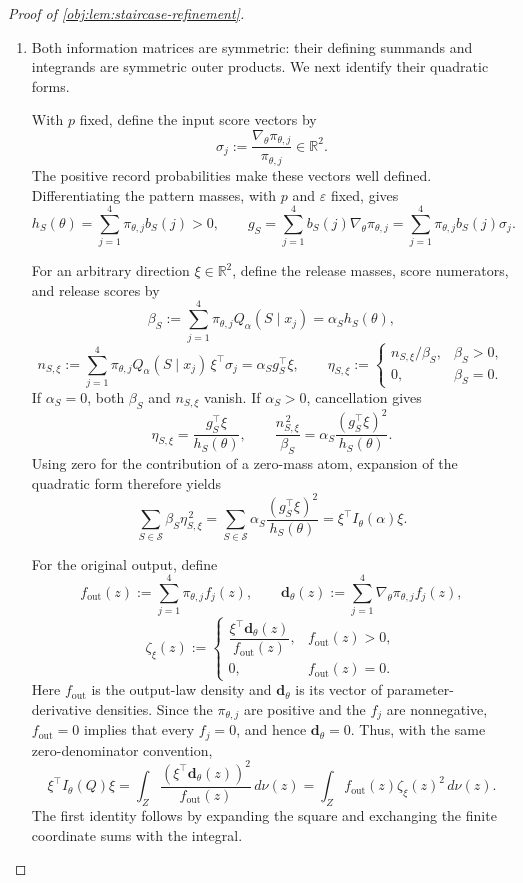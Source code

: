 \documentclass[11pt]{article}
\begin{document}
\begin{proof}[Proof of \cref{obj:lem:staircase-refinement}]
\begin{enumerate}
\item
Both information matrices are symmetric: their defining summands and integrands are symmetric outer products. We next identify their quadratic forms.

With \(p\) fixed, define the input score vectors by
\[
\sigma_j:=\frac{\nabla_\theta\pi_{\theta,j}}{\pi_{\theta,j}}
\in\mathbb R^2.
\]
The positive record probabilities make these vectors well defined. Differentiating the pattern masses, with \(p\) and \(\varepsilon\) fixed, gives
\[
h_S(\theta)=\sum_{j=1}^{4}\pi_{\theta,j}b_S(j)>0,
\qquad
g_S
=\sum_{j=1}^{4}b_S(j)\nabla_\theta\pi_{\theta,j}
=\sum_{j=1}^{4}\pi_{\theta,j}b_S(j)\sigma_j.
\]

For an arbitrary direction \(\xi\in\mathbb R^2\), define the release masses, score numerators, and release scores by
\[
\beta_S:=
\sum_{j=1}^{4}\pi_{\theta,j}Q_\alpha(S\mid x_j)
=\alpha_S h_S(\theta),
\]
\[
n_{S,\xi}:=
\sum_{j=1}^{4}\pi_{\theta,j}Q_\alpha(S\mid x_j)
\,\xi^\top\sigma_j
=\alpha_S g_S^\top\xi,
\qquad
\eta_{S,\xi}:=
\begin{cases}
n_{S,\xi}/\beta_S,&\beta_S>0,\\
0,&\beta_S=0.
\end{cases}
\]
If \(\alpha_S=0\), both \(\beta_S\) and \(n_{S,\xi}\) vanish. If \(\alpha_S>0\), cancellation gives
\[
\eta_{S,\xi}=\frac{g_S^\top\xi}{h_S(\theta)},
\qquad
\frac{n_{S,\xi}^{\,2}}{\beta_S}
=\alpha_S\frac{(g_S^\top\xi)^2}{h_S(\theta)}.
\]
Using zero for the contribution of a zero-mass atom, expansion of the quadratic form therefore yields
\[
\sum_{S\in\mathcal S}\beta_S\eta_{S,\xi}^{\,2}
=
\sum_{S\in\mathcal S}
\alpha_S\frac{(g_S^\top\xi)^2}{h_S(\theta)}
=\xi^\top I_\theta(\alpha)\xi.
\]

For the original output, define
\[
f_{\mathrm{out}}(z):=
\sum_{j=1}^{4}\pi_{\theta,j}f_j(z),
\qquad
\mathbf d_\theta(z):=
\sum_{j=1}^{4}\nabla_\theta\pi_{\theta,j}f_j(z),
\]
\[
\zeta_\xi(z):=
\begin{cases}
\dfrac{\xi^\top\mathbf d_\theta(z)}{f_{\mathrm{out}}(z)},
   &f_{\mathrm{out}}(z)>0,\\
0,&f_{\mathrm{out}}(z)=0.
\end{cases}
\]
Here \(f_{\mathrm{out}}\) is the output-law density and
\(\mathbf d_\theta\) is its vector of parameter-derivative densities.
Since the \(\pi_{\theta,j}\) are positive and the \(f_j\) are nonnegative,
\(f_{\mathrm{out}}=0\) implies that every \(f_j=0\), and hence
\(\mathbf d_\theta=0\). Thus, with the same zero-denominator convention,
\[
\xi^\top I_\theta(Q)\xi
=
\int_Z
\frac{(\xi^\top\mathbf d_\theta(z))^2}{f_{\mathrm{out}}(z)}
\,d\nu(z)
=
\int_Z f_{\mathrm{out}}(z)\zeta_\xi(z)^2\,d\nu(z).
\]
The first identity follows by expanding the square and exchanging the finite coordinate sums with the integral.


\end{enumerate}
\end{proof}
\end{document}
